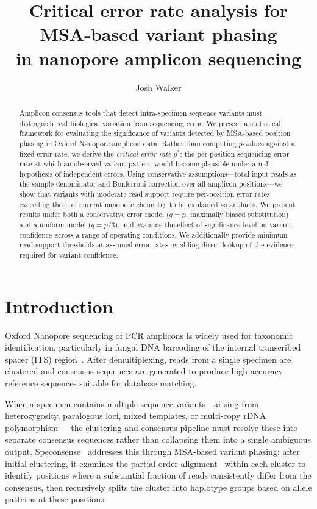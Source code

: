 \documentclass[11pt]{article}
\title{Critical error rate analysis for MSA-based variant phasing\\in nanopore amplicon sequencing}
\author{Josh Walker}
\date{}
\begin{document}
\maketitle

\begin{abstract}
Amplicon consensus tools that detect intra-specimen sequence variants must
distinguish real biological variation from sequencing error. We present a
statistical framework for evaluating the significance of variants detected by
MSA-based position phasing in Oxford Nanopore amplicon data. Rather than
computing $p$-values against a fixed error rate, we derive the \emph{critical
error rate} $p^*$: the per-position sequencing error rate at which an observed
variant pattern would become plausible under a null hypothesis of independent
errors. Using conservative assumptions---total input reads as the sample
denominator and Bonferroni correction over all amplicon positions---we show that
variants with moderate read support require per-position error rates exceeding
those of current nanopore chemistry to be explained as artifacts. We present
results under both a conservative error model ($q = p$, maximally biased
substitution) and a uniform model ($q = p/3$), and examine the effect of
significance level on variant confidence across a range of operating conditions.
We additionally provide minimum read-support thresholds at assumed error rates,
enabling direct lookup of the evidence required for variant confidence.
\end{abstract}

\section{Introduction}

Oxford Nanopore sequencing of PCR amplicons is widely used for taxonomic
identification, particularly in fungal DNA barcoding of the internal transcribed
spacer (ITS) region~\cite{schoch2012}. After demultiplexing, reads from a single
specimen are clustered and consensus sequences are generated to produce
high-accuracy reference sequences suitable for database matching.

When a specimen contains multiple sequence variants---arising from heterozygosity,
paralogous loci, mixed templates, or multi-copy rDNA polymorphism~\cite{bradshaw2023}---the clustering
and consensus pipeline must resolve these into separate consensus sequences rather
than collapsing them into a single ambiguous output. Speconsense~\cite{speconsense} addresses this
through MSA-based variant phasing: after initial clustering, it examines the
partial order alignment~\cite{lee2003,vaser2017} within each cluster to identify
positions where a substantial fraction of reads consistently differ from the
consensus, then recursively splits the cluster into haplotype groups based on
allele patterns at these positions.
\end{document}
